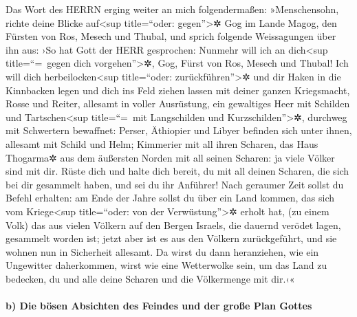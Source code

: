 Das Wort des HERRN erging weiter an mich folgendermaßen:
»Menschensohn, richte deine Blicke auf\textless sup
title=``oder: gegen''\textgreater✲ Gog im Lande Magog, den Fürsten von
Ros, Mesech und Thubal, und sprich folgende Weissagungen über ihn aus:
›So hat Gott der HERR gesprochen: Nunmehr will ich an
dich\textless sup title=``=~gegen dich vorgehen''\textgreater✲, Gog,
Fürst von Ros, Mesech und Thubal! Ich will dich
herbeilocken\textless sup title=``oder: zurückführen''\textgreater✲ und
dir Haken in die Kinnbacken legen und dich ins Feld ziehen lassen mit
deiner ganzen Kriegsmacht, Rosse und Reiter, allesamt in voller
Ausrüstung, ein gewaltiges Heer mit Schilden und Tartschen\textless sup
title=``=~mit Langschilden und Kurzschilden''\textgreater✲, durchweg mit
Schwertern bewaffnet: Perser, Äthiopier und Libyer
befinden sich unter ihnen, allesamt mit Schild und Helm;
Kimmerier mit all ihren Scharen, das Haus Thogarma✲ aus
dem äußersten Norden mit all seinen Scharen: ja viele Völker sind mit
dir. Rüste dich und halte dich bereit, du mit all deinen
Scharen, die sich bei dir gesammelt haben, und sei du ihr Anführer!
Nach geraumer Zeit sollst du Befehl erhalten: am Ende der
Jahre sollst du über ein Land kommen, das sich vom Kriege\textless sup
title=``oder: von der Verwüstung''\textgreater✲ erholt hat, (zu einem
Volk) das aus vielen Völkern auf den Bergen Israels, die dauernd verödet
lagen, gesammelt worden ist; jetzt aber ist es aus den Völkern
zurückgeführt, und sie wohnen nun in Sicherheit allesamt.
Da wirst du dann heranziehen, wie ein Ungewitter
daherkommen, wirst wie eine Wetterwolke sein, um das Land zu bedecken,
du und alle deine Scharen und die Völkermenge mit dir.‹«

\hypertarget{b-die-buxf6sen-absichten-des-feindes-und-der-grouxdfe-plan-gottes}{%
\paragraph{b) Die bösen Absichten des Feindes und der große Plan
Gottes}\label{b-die-buxf6sen-absichten-des-feindes-und-der-grouxdfe-plan-gottes}}


